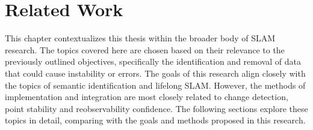 \section{Related Work}
\label{sec:related_work}

This chapter contextualizes this thesis within the broader body of SLAM research. The topics covered here are chosen based on their relevance to the previously outlined objectives, specifically the identification and removal of data that could cause instability or errors. The goals of this research align closely with the topics of semantic identification and lifelong SLAM. However, the methods of implementation and integration are most closely related to change detection, point stability and reobservability confidence. The following sections explore these topics in detail, comparing with the goals and methods proposed in this research.

% 